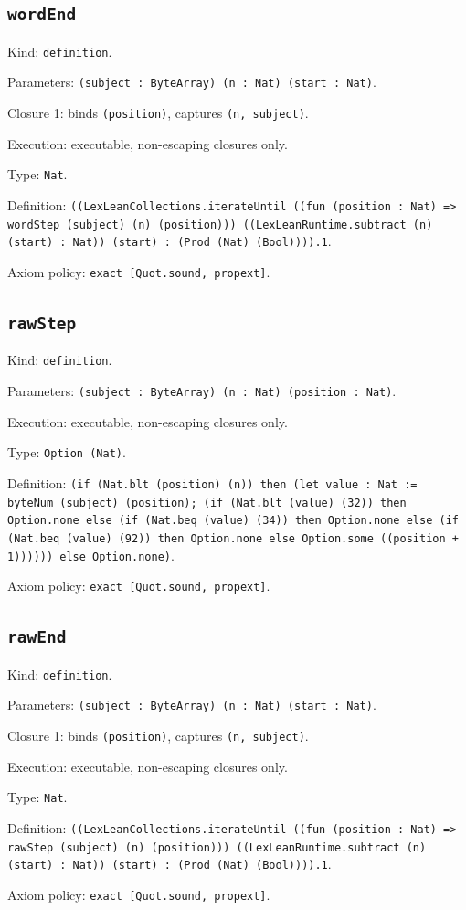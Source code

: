\documentclass[11pt]{article}
\begin{document}
\subsection*{\texttt{wordEnd}}
\noindent Kind: \texttt{definition}.\par
\noindent Parameters: \texttt{(subject : ByteArray) (n : Nat) (start : Nat)}.\par
\noindent Closure 1: binds \texttt{(position)}, captures \texttt{(n, subject)}.\par
\noindent Execution: executable, non-escaping closures only.\par
\noindent Type: \texttt{Nat}.\par
\noindent Definition: \texttt{((LexLeanCollections.iterateUntil ((fun (position : Nat) => wordStep (subject) (n) (position))) ((LexLeanRuntime.subtract (n) (start) : Nat)) (start) : (Prod (Nat) (Bool)))).1}.\par
\noindent Axiom policy: \texttt{exact [Quot.sound, propext]}.\par
\subsection*{\texttt{rawStep}}
\noindent Kind: \texttt{definition}.\par
\noindent Parameters: \texttt{(subject : ByteArray) (n : Nat) (position : Nat)}.\par
\noindent Execution: executable, non-escaping closures only.\par
\noindent Type: \texttt{Option (Nat)}.\par
\noindent Definition: \texttt{(if (Nat.blt (position) (n)) then (let value : Nat := byteNum (subject) (position); (if (Nat.blt (value) (32)) then Option.none else (if (Nat.beq (value) (34)) then Option.none else (if (Nat.beq (value) (92)) then Option.none else Option.some ((position + 1)))))) else Option.none)}.\par
\noindent Axiom policy: \texttt{exact [Quot.sound, propext]}.\par
\subsection*{\texttt{rawEnd}}
\noindent Kind: \texttt{definition}.\par
\noindent Parameters: \texttt{(subject : ByteArray) (n : Nat) (start : Nat)}.\par
\noindent Closure 1: binds \texttt{(position)}, captures \texttt{(n, subject)}.\par
\noindent Execution: executable, non-escaping closures only.\par
\noindent Type: \texttt{Nat}.\par
\noindent Definition: \texttt{((LexLeanCollections.iterateUntil ((fun (position : Nat) => rawStep (subject) (n) (position))) ((LexLeanRuntime.subtract (n) (start) : Nat)) (start) : (Prod (Nat) (Bool)))).1}.\par
\noindent Axiom policy: \texttt{exact [Quot.sound, propext]}.\par
\end{document}
